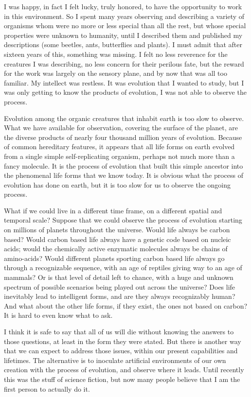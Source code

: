 I was happy, in fact I felt lucky, truly honored, to have the opportunity to
work in this environment.  So I spent many years observing and describing
a variety of organisms whom were no more or less special than all the rest,
but whose special properties were unknown to humanity, until I described them
and published my descriptions (some beetles, ants, butterflies and plants).
I must admit that after sixteen years of this, something was missing.  I felt
no less reverence for the creatures I was describing, no less concern for their
perilous fate, but the reward for the work was largely on the sensory plane,
and by now that was all too familiar.  My intellect was restless.  It was
evolution that I wanted to study, but I was only getting to know the products
of evolution, I was not able to observe the process.

Evolution among the organic creatures that inhabit earth is too slow to
observe.  What we have available for observation, covering the surface of
the planet, are the diverse products of nearly four thousand million years of
evolution.  Because of common hereditary features, it appears that all life
forms on earth evolved from a single simple self-replicating organism,
perhaps not much more than a fancy molecule.  It is the process of evolution
that built this simple ancestor into the phenomenal life forms that we know
today.  It is obvious what the process of evolution has done on earth,
but it is too slow for us to observe the ongoing process.

What if we could live in a different time frame, on a different spatial
and temporal scale?  Suppose that we could observe the process of evolution
starting on millions of planets throughout the universe.  Would life always
be carbon based?  Would carbon based life always have a genetic code based
on nucleic acids; would the chemically active enzymatic molecules always be
chains of amino-acids?  Would different planets sporting carbon based life
always go through a recognizable sequence, with an age of reptiles giving
way to an age of mammals?  Or is that level of detail left to chance, with
a huge and unknown spectrum of possible scenarios being played out across
the universe?  Does life inevitably lead to intelligent forms, and are they
always recognizably human?  And what about the other life forms, if they
exist, the ones not based on carbon?  It is hard to even know what to ask.

I think it is safe to say that all of us will die without knowing the answers
to those questions, at least in the form they were stated.  But there is
another way that we can expect to address those issues, within our present
capabilities and lifetimes.  The alternative is to inoculate artificial
environments of our own creation with the process of evolution, and observe
where it leads.  Until recently this was the stuff of science fiction, but
now many people believe that I am the first person to actually do it.

